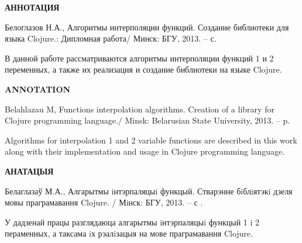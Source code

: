 \begin{center}\textbf{АННОТАЦИЯ}\end{center}

Белоглазов Н.А., Алгоритмы интерполяции функций. Создание библиотеки для языка Clojure.: Дипломная работа/ Минск: БГУ, 2013. –  с.

В данной работе рассматриваются алгоритмы интерполяции функций 1 и 2 переменных, а также их реализация и создание библиотеки на языке Clojure.
\vspace{2cm}


\begin{center}\textbf{ANNOTATION}\end{center}

Belahlazau M, Functions interpolation algorithms. Creation of a library for Clojure programming language./ Minsk: Belarusian State University, 2013. –  p.

Algorithms for interpolation 1 and 2 variable functions are described in this work along with their implementation and usage in Clojure programming language.
\vspace{2cm}


\begin{center}\textbf{АНАТАЦЫЯ}\end{center}

Белаглазаў М.А., Алгарытмы iнтэрпаляцыi функцый. Стварэнне бiблiятэкi дзеля мовы праграмавання Clojure. / Мiнск: БГУ, 2013. – с .

У дадзенай працы разглядаюца алгарытмы iнтэрпаляцыi функцый 1 i 2 пераменных, а таксама iх рэалiзацыя на мове праграмавання Clojure.







